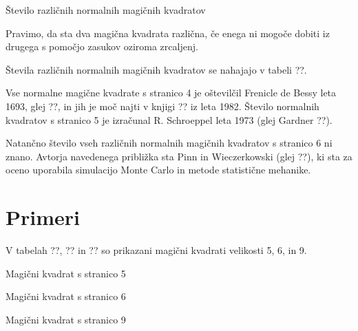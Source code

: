 \documentclass[a4paper,12pt]{article}
\begin{document}
Število različnih normalnih magičnih kvadratov

   Pravimo, da sta dva magična kvadrata različna, če enega ni mogoče dobiti
   iz drugega s pomočjo zasukov oziroma zrcaljenj.

Števila različnih normalnih magičnih kvadratov se nahajajo v tabeli ??.

Vse normalne magične kvadrate s stranico 4 je oštevilčil Frenicle de Bessy
leta 1693, glej ??, in jih je moč najti v knjigi ??
iz leta 1982. Število normalnih kvadratov s stranico 5 je izračunal
R. Schroeppel leta 1973 (glej Gardner ??).

Natančno število vseh različnih normalnih magičnih kvadratov s stranico 6 ni znano.
Avtorja navedenega približka sta Pinn in Wieczerkowski (glej ??), ki
sta za oceno uporabila simulacijo Monte Carlo in metode statistične mehanike.

\section{Primeri}


V tabelah ??, ?? in ?? so prikazani
magični kvadrati velikosti 5, 6, in 9.

Magični kvadrat s stranico 5

Magični kvadrat s stranico 6

Magični kvadrat s stranico 9
\end{document}

